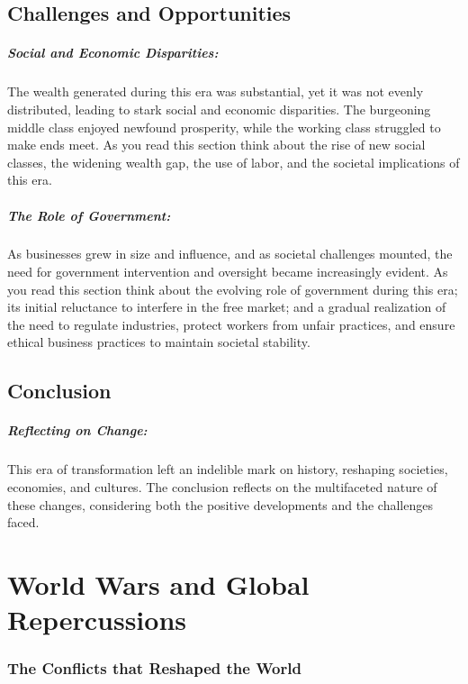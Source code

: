 \documentclass[a4paper,12pt]{book}
\begin{document}
\section*{Challenges and Opportunities}

\paragraph{Social and Economic Disparities:}
The wealth generated during this era was substantial, yet it was not evenly distributed, leading to stark social and economic disparities. The burgeoning middle class enjoyed newfound prosperity, while the working class struggled to make ends meet. As you read this section think about the rise of new social classes, the widening wealth gap, the use of labor, and the societal implications of this era.

\paragraph{The Role of Government:}
As businesses grew in size and influence, and as societal challenges mounted, the need for government intervention and oversight became increasingly evident. As you read this section think about the evolving role of government during this era; its initial reluctance to interfere in the free market; and a gradual realization of the need to regulate industries, protect workers from unfair practices, and ensure ethical business practices to maintain societal stability.

\section*{Conclusion}

\paragraph{Reflecting on Change:}
This era of transformation left an indelible mark on history, reshaping societies, economies, and cultures. The conclusion reflects on the multifaceted nature of these changes, considering both the positive developments and the challenges faced.

\chapter{World Wars and Global Repercussions}
\subsection*{The Conflicts that Reshaped the World}
\end{document}
